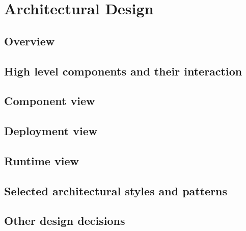\pagebreak
\section{Architectural Design}
 
\subsection{Overview}
\subsection{High level components and their interaction}
\subsection{Component view}
\subsection{Deployment view}
\subsection{Runtime view}
\subsection{Selected architectural styles and patterns}
\subsection{Other design decisions}
